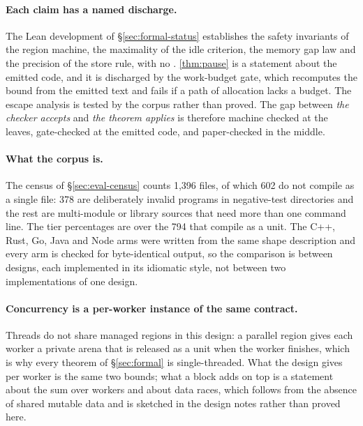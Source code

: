 \paragraph{Each claim has a named discharge.}
The Lean development of \S\ref{sec:formal-status} establishes the safety invariants of the region
machine, the maximality of the idle criterion, the memory gap law and the precision of the store
rule, with no .  \thm\ref{thm:pause} is a statement about the emitted code, and it is
discharged by the work-budget gate, which recomputes the bound from the emitted text and fails if a
path of allocation lacks a budget.  The escape analysis is tested by the corpus rather than proved.
The gap between \emph{the checker accepts} and \emph{the theorem applies} is therefore machine
checked at the leaves, gate-checked at the emitted code, and paper-checked in the middle.

\paragraph{What the corpus is.}
The census of \S\ref{sec:eval-census} counts 1,396  files, of which 602 do not compile
as a single file: 378 are deliberately invalid programs in negative-test directories and the rest
are multi-module or library sources that need more than one command line.  The tier percentages are
over the 794 that compile as a unit.  The C++, Rust, Go, Java and Node arms were written from the
same shape description and every arm is checked for byte-identical output, so the comparison is
between designs, each implemented in its idiomatic style, not between two implementations of one
design.

\paragraph{Concurrency is a per-worker instance of the same contract.}
Threads do not share managed regions in this design: a parallel region gives each worker a private
arena that is released as a unit when the worker finishes, which is why every theorem of
\S\ref{sec:formal} is single-threaded.  What the design gives per worker is the same two bounds; what
a  block adds on top is a statement about the sum over workers and about data races,
which follows from the absence of shared mutable data and is sketched in the design notes rather than
proved here.
